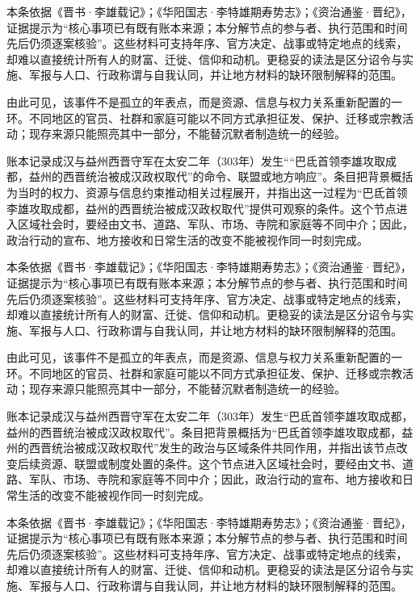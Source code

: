 本条依据《晋书·李雄载记》；《华阳国志·李特雄期寿势志》；《资治通鉴·晋纪》，证据提示为“核心事项已有既有账本来源；本分解节点的参与者、执行范围和时间先后仍须逐案核验”。这些材料可支持年序、官方决定、战事或特定地点的线索，却难以直接统计所有人的财富、迁徙、信仰和动机。更稳妥的读法是区分诏令与实施、军报与人口、行政称谓与自我认同，并让地方材料的缺环限制解释的范围。

由此可见，该事件不是孤立的年表点，而是资源、信息与权力关系重新配置的一环。不同地区的官员、社群和家庭可能以不同方式承担征发、保护、迁移或宗教活动；现存来源只能照亮其中一部分，不能替沉默者制造统一的经验。

账本记录成汉与益州西晋守军在太安二年（303年）发生““巴氐首领李雄攻取成都，益州的西晋统治被成汉政权取代”的命令、联盟或地方响应”。条目把背景概括为当时的权力、资源与信息约束推动相关过程展开，并指出这一过程为“巴氐首领李雄攻取成都，益州的西晋统治被成汉政权取代”提供可观察的条件。这个节点进入区域社会时，要经由文书、道路、军队、市场、寺院和家庭等不同中介；因此，政治行动的宣布、地方接收和日常生活的改变不能被视作同一时刻完成。

本条依据《晋书·李雄载记》；《华阳国志·李特雄期寿势志》；《资治通鉴·晋纪》，证据提示为“核心事项已有既有账本来源；本分解节点的参与者、执行范围和时间先后仍须逐案核验”。这些材料可支持年序、官方决定、战事或特定地点的线索，却难以直接统计所有人的财富、迁徙、信仰和动机。更稳妥的读法是区分诏令与实施、军报与人口、行政称谓与自我认同，并让地方材料的缺环限制解释的范围。

由此可见，该事件不是孤立的年表点，而是资源、信息与权力关系重新配置的一环。不同地区的官员、社群和家庭可能以不同方式承担征发、保护、迁移或宗教活动；现存来源只能照亮其中一部分，不能替沉默者制造统一的经验。

账本记录成汉与益州西晋守军在太安二年（303年）发生“巴氐首领李雄攻取成都，益州的西晋统治被成汉政权取代”。条目把背景概括为“巴氐首领李雄攻取成都，益州的西晋统治被成汉政权取代”发生的政治与区域条件共同作用，并指出该节点改变后续资源、联盟或制度处置的条件。这个节点进入区域社会时，要经由文书、道路、军队、市场、寺院和家庭等不同中介；因此，政治行动的宣布、地方接收和日常生活的改变不能被视作同一时刻完成。

本条依据《晋书·李雄载记》；《华阳国志·李特雄期寿势志》；《资治通鉴·晋纪》，证据提示为“核心事项已有既有账本来源；本分解节点的参与者、执行范围和时间先后仍须逐案核验”。这些材料可支持年序、官方决定、战事或特定地点的线索，却难以直接统计所有人的财富、迁徙、信仰和动机。更稳妥的读法是区分诏令与实施、军报与人口、行政称谓与自我认同，并让地方材料的缺环限制解释的范围。

